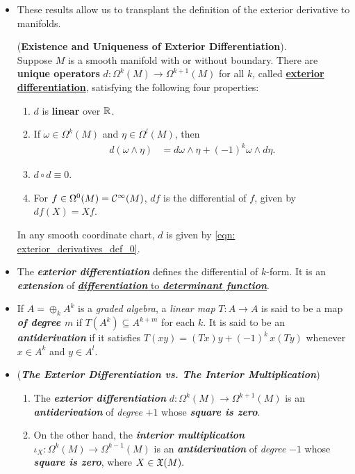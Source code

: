 \documentclass[11pt]{article}
\begin{document}
\begin{itemize}
\item These results allow us to transplant the definition of the exterior derivative to
manifolds.
\begin{theorem} (\textbf{Existence and Uniqueness of Exterior Differentiation}).\\
Suppose $M$ is a smooth manifold with or without boundary. There are \textbf{unique operators} $d: \Omega^k(M) \rightarrow \Omega^{k+1}(M)$ for all $k$, called \underline{\textbf{exterior differentiation}}, satisfying the following four properties:
\begin{enumerate}
\item $d$ is \textbf{linear} over ${\mathbb R}$.
\item If $\omega \in \Omega^{k}(M)$ and $\eta \in \Omega^{l}(M)$, then
\begin{align*}
d(\omega \wedge \eta) &= d\omega \wedge \eta + (-1)^{k}\omega \wedge d \eta.
\end{align*}
\item $d \circ d  \equiv 0$.
\item For $f \in \Omega^0(M) = {\mathcal C}^{\infty}(M)$, $df$ is the differential of $f$, given by $df(X) =Xf$.
\end{enumerate}
In any smooth coordinate chart, $d$ is given by \eqref{eqn: exterior_derivatives_def_0}.
\end{theorem}

\item \begin{remark}
The \emph{\textbf{exterior differentiation}} defines the differential of $k$-form. It is an \textbf{\emph{extension}} of \underline{\emph{\textbf{differentiation}} to \emph{\textbf{determinant function}}}.
\end{remark}


\item \begin{definition}
If $A =  \oplus_{k} A^k$ is a \emph{graded algebra}, a \emph{linear map} $T: A \rightarrow A$ is said to be a map \emph{\textbf{of degree $m$}} if $T(A^k) \subseteq A^{k+m}$ for each $k$. It is said to be an \emph{\textbf{antiderivation}} if it satisfies $T(xy) = (Tx)y + (-1)^k\, x(Ty)$ whenever $x\in A^k$ and $y \in A^l$. 
\end{definition}

\item \begin{remark} (\emph{\textbf{The Exterior Differentiation vs. The Interior Multiplication}})
\begin{enumerate}
\item The \emph{\textbf{exterior differentiation}} $d: \Omega^k(M) \rightarrow \Omega^{k+1}(M)$ is an  \emph{\textbf{antiderivation}} of \emph{degree} $+1$ whose \emph{\textbf{square is zero}}.
\item On the other hand, the \emph{\textbf{interior multiplication}} $\iota_{X}: \Omega^k(M) \rightarrow \Omega^{k-1}(M)$ is an \emph{\textbf{antiderivation}} of \emph{degree} $-1$ whose \emph{\textbf{square is zero}}, where $X \in {\mathfrak X}(M).$
\end{enumerate}
\end{remark}


\end{itemize}
\end{document}

